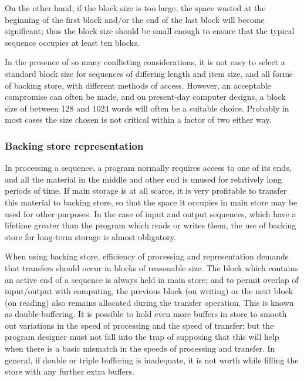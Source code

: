 On the other hand, if the block size is too large, the space wasted at the beginning of the first block $\text{and}/\text{or}$ the end of the last block will become significant; thus the block size should be small enough to ensure that the typical sequence occupies at least ten blocks.

In the presence of so many conflicting considerations, it is not easy to select a standard block size for sequences of differing length and item size, and all forms of backing store, with different methods of access. However, an acceptable compromise can often be made, and on present-day computer designs, a block size of between 128 and 1024 words will often be a suitable choice. Probably in most cases the size chosen is not critical within a factor of two either way.

\subsubsection{Backing store representation}

In processing a sequence, a program normally requires access to one of its ends, and all the material in the middle and other end is unused for relatively long periods of time. If main storage is at all scarce, it is very profitable to transfer this material to backing store, so that the space it occupies in main store may be used for other purposes. In the case of input and output sequences, which have a lifetime greater than the program which reads or writes them, the use of backing store for long-term storage is almost obligatory.

When using backing store, efficiency of processing and representation demands that transfers should occur in blocks of reasonable size. The block which contains an active end of a sequence is always held in main store; and to permit overlap of input$/$output with computing, the previous block (on writing) or the next block (on reading) also remains allocated during the transfer operation. This is known as double-buffering. It is possible to hold even more buffers in store to smooth out variations in the speed of processing and the speed of transfer; but the program designer must not fall into the trap of supposing that this will help when there is a basic mismatch in the speeds of processing and transfer. In general, if double or triple buffering is inadequate, it is not worth while filling the store with any further extra buffers.

